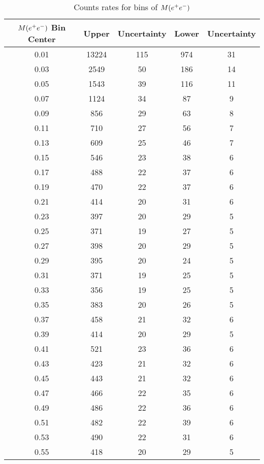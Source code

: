 \begin{table}[h!]
\begin{minipage}{\textwidth}
\begin{center}

\caption[Expected count rates]{\label{tab:counts}Counts rates for bins of $M(e^+e^-)$ \vspace{0.75mm}}

\begin{tabular}{c|c|c|c|c}

\hline
$M(e^+e^-)$ Bin Center & Upper  & Uncertainty & Lower & Uncertainty \\
\hline
0.01  & 13224  & 115  & 974  & 31\\
0.03  & 2549  & 50  & 186  & 14\\
0.05  & 1543  & 39  & 116  & 11\\
0.07  & 1124  & 34  & 87  & 9\\
0.09  & 856  & 29  & 63  & 8\\
0.11  & 710  & 27  & 56  & 7\\
0.13  & 609  & 25  & 46  & 7\\
0.15  & 546  & 23  & 38  & 6\\
0.17  & 488  & 22  & 37  & 6\\
0.19  & 470  & 22  & 37  & 6\\
0.21  & 414  & 20  & 31  & 6\\
0.23  & 397  & 20  & 29  & 5\\
0.25  & 371  & 19  & 27  & 5\\
0.27  & 398  & 20  & 29  & 5\\
0.29  & 395  & 20  & 24  & 5\\
0.31  & 371  & 19  & 25  & 5\\
0.33  & 356  & 19  & 25  & 5\\
0.35  & 383  & 20  & 26  & 5\\
0.37  & 458  & 21  & 32  & 6\\
0.39  & 414  & 20  & 29  & 5\\
0.41  & 521  & 23  & 36  & 6\\
0.43  & 423  & 21  & 32  & 6\\
0.45  & 443  & 21  & 32  & 6\\
0.47  & 466  & 22  & 35  & 6\\
0.49  & 486  & 22  & 36  & 6\\
0.51  & 482  & 22  & 39  & 6\\
0.53  & 490  & 22  & 31  & 6\\
0.55  & 418  & 20  & 29  & 5\\

\end{tabular}
\end{center}
\end{minipage}
\end{table}
